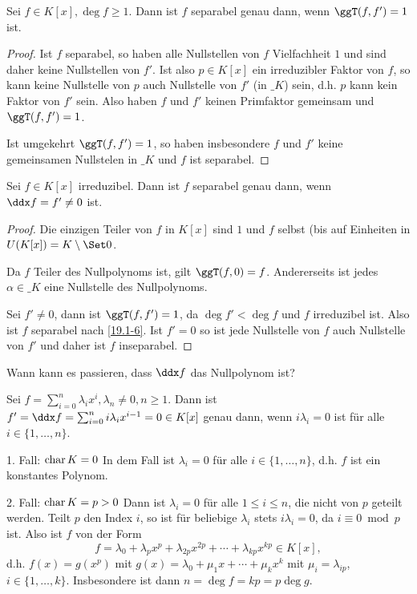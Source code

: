 \begin{kor} \label{dup:19.1-6}
	Sei $f \in K[x], \deg f \ge 1$.
	Dann ist $f$ separabel genau dann, wenn $\ggT(f, f') = 1$ ist.
	\begin{proof}
		Ist $f$ separabel, so haben alle Nullstellen von $f$ Vielfachheit $1$ und sind daher keine Nullstellen von $f'$.
		Ist also $p \in K[x]$ ein irreduzibler Faktor von $f$, so kann keine Nullstelle von $p$ auch Nullstelle von $f'$ (in $\_K$) sein, d.h. $p$ kann kein Faktor von $f'$ sein.
		Also haben $f$ und $f'$ keinen Primfaktor gemeinsam und $\ggT(f, f') = 1$.

		Ist umgekehrt $\ggT(f,f') = 1$, so haben insbesondere $f$ und $f'$ keine gemeinsamen Nullstelen in $\_K$ und $f$ ist separabel.
	\end{proof}
\end{kor}

\begin{kor} \label{19.1-7}
	Sei $f \in K[x]$ irreduzibel.
	Dann ist $f$ separabel genau dann, wenn $\ddx f = f' \neq 0$ ist.
	\begin{proof}
		Die einzigen Teiler von $f$ in $K[x]$ sind $1$ und $f$ selbst (bis auf Einheiten in $U(K[x]) = K \setminus \Set 0$.

		Da $f$ Teiler des Nullpolynoms ist, gilt $\ggT(f, 0) = f$.
		Andererseits ist jedes $\alpha \in \_K$ eine Nullstelle des Nullpolynoms.

		Sei $f' \neq 0$, dann ist $\ggT(f, f') = 1$, da $\deg f' < \deg f$ und $f$ irreduzibel ist.
		Also ist $f$ separabel nach \ref{19.1-6}.
		Ist $f' = 0$ so ist jede Nullstelle von $f$ auch Nullstelle von $f'$ und daher ist $f$ inseparabel.
	\end{proof}
\end{kor}

Wann kann es passieren, dass $\ddx f$ das Nullpolynom ist?

Sei $f = \sum_{i=0}^n \lambda_i x^i, \lambda_n \neq 0, n \ge 1$.
Dann ist $f' = \ddx f = \sum_{i=0}^n i \lambda_i x^{i-1} = 0 \in K[x]$ genau dann, wenn $i \lambda_i = 0$ ist für alle $i \in \{1, \dotsc, n\}$.
\begin{seg}{1. Fall: $\operatorname{char} K = 0$}
	In dem Fall ist $\lambda_i = 0$ für alle $i \in \{1, \dotsc, n\}$, d.h. $f$ ist ein konstantes Polynom.
\end{seg}
\begin{seg}{2. Fall: $\operatorname{char} K = p > 0$}
	Dann ist $\lambda_i = 0$ für alle $1 \le i \le n$, die nicht von $p$ geteilt werden.
	Teilt $p$ den Index $i$, so ist für beliebige $\lambda_i$ stets $i \lambda_i = 0$, da $i \equiv 0 \bmod p$ ist.
	Also ist $f$ von der Form
	\[
		f = \lambda_0 + \lambda_p x^p + \lambda_{2p} x^{2p} + \dotsb + \lambda_{kp} x^{kp} \in K[x],
	\]
	d.h. $f(x) = g(x^p)$ mit $g(x) = \lambda_0 + \mu_1 x + \dotsb + \mu_k x^k$ mit $\mu_i = \lambda_{ip}$, $i \in \{1, \dotsc, k\}$.
	Insbesondere ist dann $n = \deg f = kp = p \deg g$.
\end{seg}

